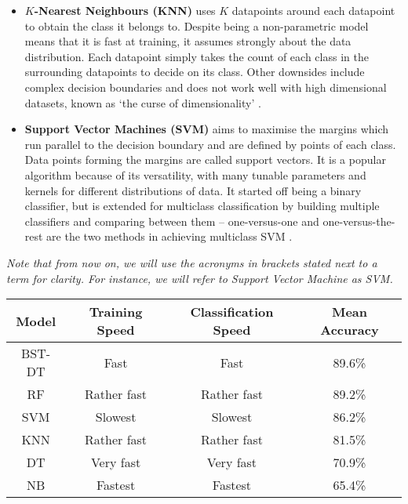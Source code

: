 \begin{itemize}
  \item \textbf{$K$-Nearest Neighbours (KNN)} uses $K$ datapoints around each datapoint to obtain the class it belongs to. Despite being a non-parametric model means that it is fast at training, it assumes strongly about the data distribution. Each datapoint simply takes the count of each class in the surrounding datapoints to decide on its class. Other downsides include complex decision boundaries and does not work well with high dimensional datasets, known as `the curse of dimensionality' \cite{mur-book}. 

  \item \textbf{Support Vector Machines (SVM)} aims to maximise the margins which run parallel to the decision boundary and are defined by points of each class. Data points forming the margins are called support vectors. It is a popular algorithm because of its versatility, with many tunable parameters and kernels for different distributions of data. It started off being a binary classifier, but is extended for multiclass classification by building multiple classifiers and comparing between them -- one-versus-one and one-versus-the-rest are the two methods in achieving multiclass SVM \cite{bishop-book}. 
\end{itemize}

\textit{Note that from now on, we will use the acronyms in brackets stated next to a term for clarity. For instance, we will refer to Support Vector Machine as SVM.}
\\

\parbox{\linewidth}{
  \centering
  \begin{tabular}{|c|c|c|c|}
    \hline
    \textbf{Model} & \textbf{Training Speed} & \textbf{Classification Speed} & \textbf{Mean Accuracy}
    \\\hline
    BST-DT   & Fast           & Fast        & 89.6\%
    \\\hline
    RF       & Rather fast    & Rather fast & 89.2\%
    \\\hline
    SVM      & Slowest        & Slowest     & 86.2\%
    \\\hline
    KNN      & Rather fast    & Rather fast & 81.5\%
    \\\hline
    DT       & Very fast      & Very fast   & 70.9\%
    \\\hline
    NB       & Fastest        & Fastest     & 65.4\% 
    \\\hline
  \end{tabular}

  \label{tab:comparison}
}

